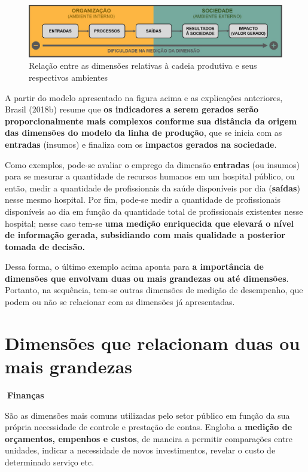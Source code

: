 \documentclass[
  letterpaper,
  DIV=11,
  numbers=noendperiod]{scrreprt}
\begin{document}
\begin{figure}

{\centering \includegraphics{images/dimensoes_cadeia_prodXambiente.JPG}

}

\caption{Relação entre as dimensões relativas à cadeia produtiva e seus
respectivos ambientes}

\end{figure}

A partir do modelo apresentado na figura acima e as explicações
anteriores, Brasil (2018b) resume que {\textbf{os indicadores a serem
gerados serão proporcionalmente mais complexos conforme sua distância da
origem das dimensões do modelo da linha de produção}}, que se inicia com
as \textbf{entradas} (insumos) e finaliza com os \textbf{impactos
gerados na sociedade}.

Como exemplos, pode-se avaliar o emprego da dimensão \textbf{entradas}
(ou insumos) para se mesurar a quantidade de recursos humanos em um
hospital público, ou então, medir a quantidade de profissionais da saúde
disponíveis por dia (\textbf{saídas}) nesse mesmo hospital. Por fim,
pode-se medir a quantidade de profissionais disponíveis ao dia em função
da quantidade total de profissionais existentes nesse hospital; nesse
caso tem-se {\textbf{uma medição enriquecida que elevará o nível de
informação gerada, subsidiando com mais qualidade a posterior tomada de
decisão.}}

Dessa forma, o último exemplo acima aponta para \textbf{a importância de
dimensões que envolvam duas ou mais grandezas ou até dimensões}.
Portanto, na sequência, tem-se outras dimensões de medição de
desempenho, que podem ou não se relacionar com as dimensões já
apresentadas.

\hypertarget{dimensuxf5es-que-relacionam-duas-ou-mais-grandezas}{%
\section{Dimensões que relacionam duas ou mais
grandezas}\label{dimensuxf5es-que-relacionam-duas-ou-mais-grandezas}}

\begin{tcolorbox}[enhanced jigsaw, opacityback=0, toprule=.15mm, breakable, leftrule=.75mm, rightrule=.15mm, left=2mm, colback=white, arc=.35mm, bottomrule=.15mm]

\textbf{🔽{Finanças}}\vspace{2mm}

São as dimensões mais comuns utilizadas pelo setor público em função da
sua própria necessidade de controle e prestação de contas. Engloba a
\textbf{medição de orçamentos, empenhos e custos}, de maneira a permitir
comparações entre unidades, indicar a necessidade de novos
investimentos, revelar o custo de determinado serviço etc.

\end{tcolorbox}
\end{document}
